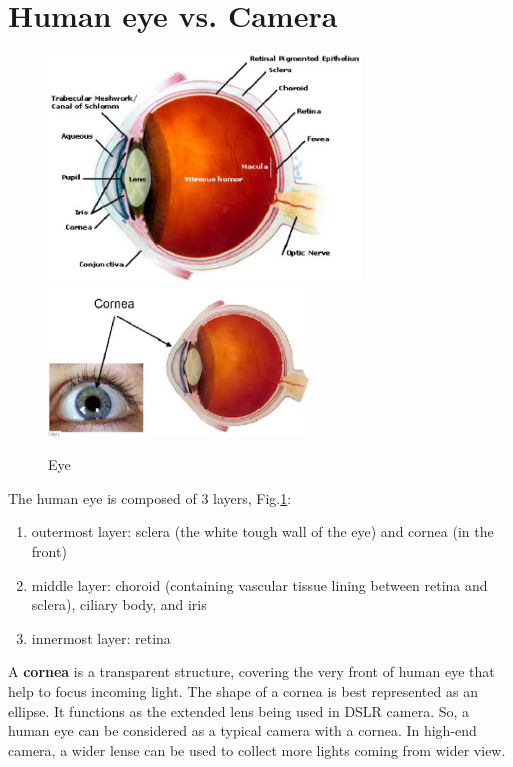 




\section{Human eye vs. Camera}

\begin{figure}[hbt]
  \centerline{\includegraphics[height=6cm,
    angle=0]{./images/eye1.eps}\includegraphics[height=4cm,
    angle=0]{./images/human_eye.eps}}    
\caption{Eye}
\label{fig:eye}
\end{figure}

The human eye is composed of 3 layers, Fig.\ref{fig:eye}:
\begin{enumerate}
  \item outermost layer: sclera (the white tough wall of the eye) and cornea
  (in the front)
  \item middle layer: choroid (containing vascular tissue lining between retina
  and sclera), ciliary body, and iris
  \item innermost layer: retina
\end{enumerate}


A {\bf cornea} is a transparent structure, covering the very front of human eye
that help to focus incoming light. The shape of a cornea is best represented as
an ellipse. It functions as the extended lens being used in DSLR camera. So, a
human eye can be considered as a typical camera with a cornea. In high-end
camera, a wider lense can be used to collect more lights coming from wider view.

